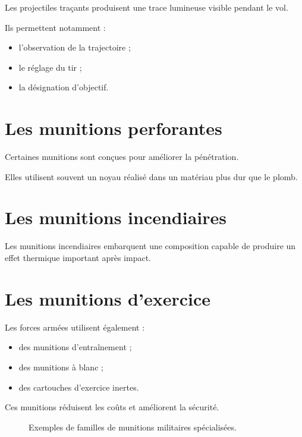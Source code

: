 Les projectiles traçants produisent une trace lumineuse visible pendant le vol.

Ils permettent notamment :

\begin{itemize}
    \item l'observation de la trajectoire ;
    \item le réglage du tir ;
    \item la désignation d'objectif.
\end{itemize}

\section{Les munitions perforantes}

Certaines munitions sont conçues pour améliorer la pénétration.

Elles utilisent souvent un noyau réalisé dans un matériau plus dur que le
plomb.

\section{Les munitions incendiaires}

Les munitions incendiaires embarquent une composition capable de produire un
effet thermique important après impact.

\section{Les munitions d'exercice}

Les forces armées utilisent également :

\begin{itemize}
    \item des munitions d'entraînement ;
    \item des munitions à blanc ;
    \item des cartouches d'exercice inertes.
\end{itemize}

Ces munitions réduisent les coûts et améliorent la sécurité.

\begin{figure}[htbp]
\centering


\caption{Exemples de familles de munitions militaires spécialisées.}
\label{fig:types_munitions_militaires}

\end{figure}

